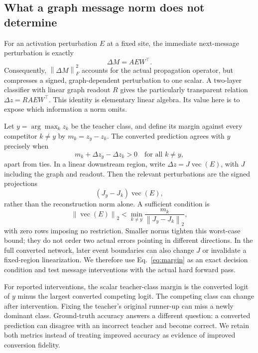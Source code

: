 \documentclass[10pt,twocolumn,letterpaper]{article}
\newcommand{\norm}[1]{\left\lVert#1\right\rVert}
\begin{document}
\subsection{What a graph message norm does not determine}
For an activation perturbation $E$ at a fixed site, the immediate next-message perturbation is exactly
\begin{equation}
 \Delta M=AEW^\top.\label{eq:message}
\end{equation}
Consequently, $\norm{\Delta M}_F^2$ accounts for the actual propagation operator, but compresses a signed, graph-dependent perturbation to one scalar. A two-layer classifier with linear graph readout $R$ gives the particularly transparent relation $\Delta z=RAEW^\top$. This identity is elementary linear algebra. Its value here is to expose which information a norm omits.

Let $y=\arg\max_k z_k$ be the teacher class, and define its margin against every competitor $k\ne y$ by $m_k=z_y-z_k$. The converted prediction agrees with $y$ precisely when
\begin{equation}
 m_k+\Delta z_y-\Delta z_k>0\quad\text{for all }k\ne y,
 \label{eq:margin}
\end{equation}
apart from ties. In a linear downstream region, write $\Delta z=J\operatorname{vec}(E)$, with $J$ including the graph and readout. Then the relevant perturbations are the signed projections
\begin{equation}
 (J_y-J_k)\operatorname{vec}(E),
\end{equation}
rather than the reconstruction norm alone. A sufficient condition is
\begin{equation}
 \norm{\operatorname{vec}(E)}_2<
 \min_{k\ne y}\frac{m_k}{\norm{J_y-J_k}_2},\label{eq:sufficient}
\end{equation}
with zero rows imposing no restriction. Smaller norms tighten this worst-case bound; they do not order two actual errors pointing in different directions. In the full converted network, later event boundaries can also change $J$ or invalidate a fixed-region linearization. We therefore use Eq.~\eqref{eq:margin} as an exact decision condition and test message interventions with the actual hard forward pass.

For reported interventions, the scalar teacher-class margin is the converted logit of $y$ minus the largest converted competing logit. The competing class can change after intervention. Fixing the teacher's original runner-up can miss a newly dominant class. Ground-truth accuracy answers a different question: a converted prediction can disagree with an incorrect teacher and become correct. We retain both metrics instead of treating improved accuracy as evidence of improved conversion fidelity.
\end{document}
